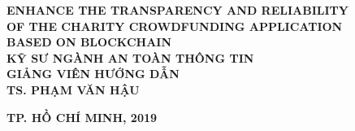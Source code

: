 \documentclass[../main-report.tex]{subfiles}
\begin{document}
\begin{titlepage}
\begin{center}
{\bf\Large ENHANCE THE TRANSPARENCY AND RELIABILITY}\\
{\bf\Large OF THE CHARITY CROWDFUNDING APPLICATION}\\
{\bf\Large BASED ON BLOCKCHAIN}\\[2cm]

{\bf\large KỸ SƯ NGÀNH AN TOÀN THÔNG TIN}\\[2cm]
{\bf GIẢNG VIÊN HƯỚNG DẪN}\\
{\bf TS. PHẠM VĂN HẬU}
\end{center}

\vspace{3cm}
\begin{center}
{\bf TP. HỒ CHÍ MINH, 2019}
\end{center}
\end{titlepage}
\end{document}
